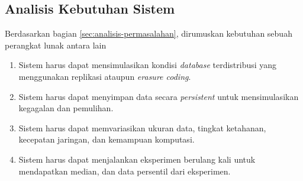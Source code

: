 \subsection{Analisis Kebutuhan Sistem}
\label{sec:analisis-kebutuhan-sistem}

Berdasarkan bagian \ref{sec:analisis-permasalahan}, dirumuskan kebutuhan sebuah perangkat lunak antara lain
\begin{enumerate}

    \item Sistem harus dapat mensimulasikan kondisi \textit{database} terdistribusi yang menggunakan replikasi ataupun \textit{erasure coding}.
    \item Sistem harus dapat menyimpan data secara \textit{persistent} untuk mensimulasikan kegagalan dan pemulihan.
    \item Sistem harus dapat memvariasikan ukuran data, tingkat ketahanan, kecepatan jaringan, dan kemampuan komputasi.
    \item Sistem harus dapat menjalankan eksperimen berulang kali untuk mendapatkan median, dan data persentil dari eksperimen.

\end{enumerate}